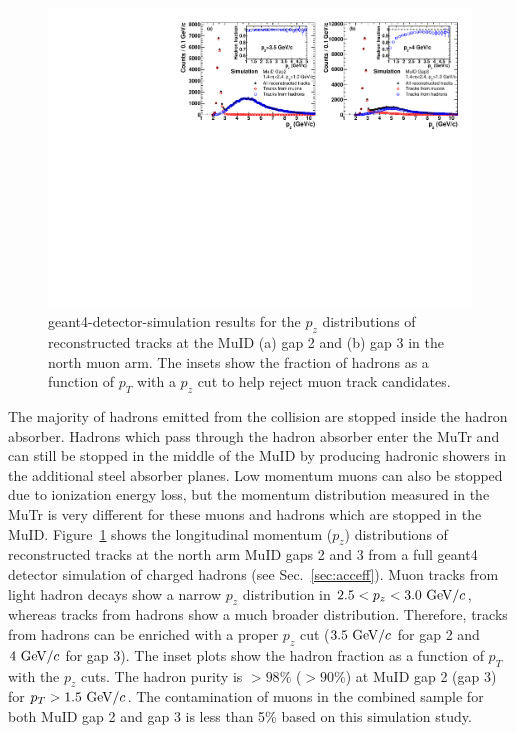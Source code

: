 \documentclass[twocolumn,letterpaper,aps,prc,longbibliography,superscriptaddress,nofootinbib,floatfix]{revtex4-2}
\newcommand{\pt}{\mbox{$p_T$}\xspace}
\newcommand{\pz}{\mbox{$p_z$}\xspace}
\newcommand{\geant}{\mbox{{\sc geant4}}\xspace}
\begin{document}
\begin{figure}[thb]
\includegraphics[width=0.998\linewidth]{G4sim_pz_arm1.pdf}
\caption{\label{fig:g4sim_pz}
\geant-detector-simulation results for the \pz distributions of 
reconstructed tracks at the MuID (a) gap 2 and (b) gap 3 in the 
north muon arm.  The insets show the fraction of hadrons as a 
function of \pt with a \pz cut to help reject muon track candidates.}
\end{figure}

The majority of hadrons emitted from the collision are stopped inside 
the hadron absorber.  Hadrons which pass through the hadron absorber 
enter the MuTr and can still be stopped in the middle of the MuID by 
producing hadronic showers in the additional steel absorber planes. Low 
momentum muons can also be stopped due to ionization energy loss, but 
the momentum distribution measured in the MuTr is very different for 
these muons and hadrons which are stopped in the MuID. 
Figure~\ref{fig:g4sim_pz} shows the longitudinal momentum (\pz) 
distributions of reconstructed tracks at the north arm MuID gaps 2 and 3 
from a full \geant detector simulation of charged hadrons (see 
Sec.~\ref{sec:acceff}). Muon tracks from light hadron decays show a 
narrow \pz distribution in $2.5<\pz<3.0~{\rm GeV}/c$, whereas tracks 
from hadrons show a much broader distribution. Therefore, tracks from 
hadrons can be enriched with a proper \pz cut ($3.5~{\rm GeV}/c$ for gap 
2 and $4~{\rm GeV}/c$ for gap 3).  The inset plots show the hadron 
fraction as a function of \pt with the \pz cuts. The hadron purity is 
$>98\%$ ($>90\%$) at MuID gap 2 (gap 3) for $\pt>1.5~{\rm GeV}/c$. The 
contamination of muons in the combined sample for both MuID gap 2 and 
gap 3 is less than 5\% based on this simulation study.
\end{document}
